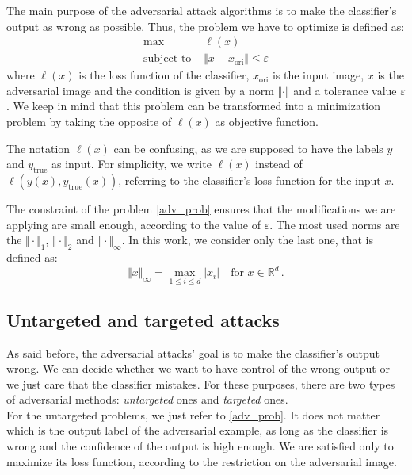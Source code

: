 \documentclass[10pt,twocolumn,letterpaper, english]{article}
\theoremstyle{definition}
\theoremstyle{plain}
\theoremstyle{plain}
\theoremstyle{plain}
\theoremstyle{plain}
\theoremstyle{remark}
\theoremstyle{remark}
\theoremstyle{definition}
\theoremstyle{definition}
\theoremstyle{definition}
\theoremstyle{definition}
\renewcommand{\epsilon}{\varepsilon}
\begin{document}
The main purpose of the adversarial attack algorithms is to make the classifier's output as wrong as possible. 
Thus, the problem we have to optimize is defined as: 
\begin{align}
    \max \, &\ell(x) \label{adv_prob} \\
    \text{subject to } & \Vert x - x_{\text{ori}} \Vert \le \epsilon \nonumber
\end{align}
where $\ell(x)$ is the loss function of the classifier, $x_{\text{ori}}$ is the input image, $x$ is the adversarial image and the condition is given by a norm $\Vert \cdot \Vert$ and a tolerance value $\epsilon$. 
We keep in mind that this problem can be transformed into a minimization problem by taking the opposite of $\ell(x)$ as objective function. 

The notation $\ell(x)$ can be confusing, as we are supposed to have the labels $y$ and $y_{\text{true}}$ as input. 
For simplicity, we write $\ell(x)$ instead of $\ell(y(x), y_{\text{true}}(x))$, referring to the classifier's loss function for the input $x$. 

The constraint of the problem \ref{adv_prob} ensures that the modifications we are applying are small enough, according to the value of $\epsilon$. 
The most used norms are the $\Vert \cdot \Vert_1$, $\Vert \cdot \Vert_2$ and $\Vert \cdot \Vert_{\infty}$. 
In this work, we consider only the last one, that is defined as: 
\begin{equation*}
    \Vert x \Vert_\infty = \max_{1\le i \le d} \vert x_i \vert \quad \text{for } x \in \mathbb{R}^d \,.
\end{equation*}

\subsection{Untargeted and targeted attacks} 

As said before, the adversarial attacks' goal is to make the classifier's output wrong. 
We can decide whether we want to have control of the wrong output or we just care that the classifier mistakes. 
For these purposes, there are two types of adversarial methods: \textit{untargeted} ones and \textit{targeted} ones. \\ 

For the untargeted problems, we just refer to \ref{adv_prob}. 
It does not matter which is the output label of the adversarial example, as long as the classifier is wrong and the confidence of the output is high enough. 
We are satisfied only to maximize its loss function, according to the restriction on the adversarial image.\\
\end{document}
